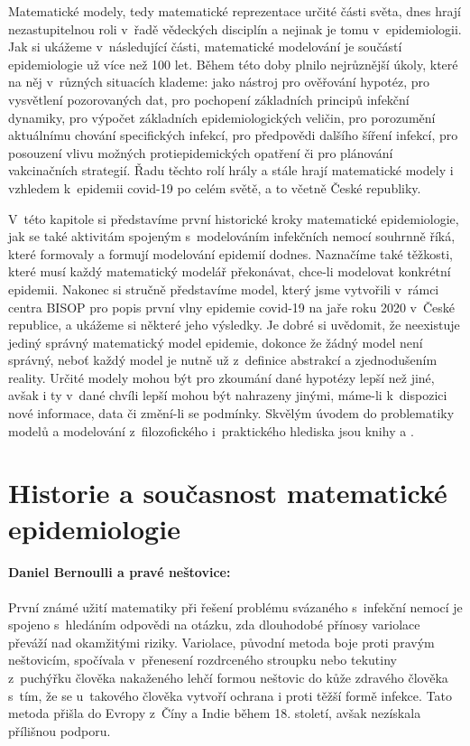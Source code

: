 Matematické modely, tedy matematické reprezentace určité části světa, dnes hrají nezastupitelnou roli v~řadě vědeckých disciplín a nejinak je tomu v~epidemiologii. Jak si ukážeme v~následující části, matematické modelování je součástí epidemiologie už více než 100 let. Během této doby plnilo nejrůznější úkoly, které na něj v~různých situacích klademe: jako nástroj pro ověřování hypotéz, pro vysvětlení pozorovaných dat, pro pochopení základních principů infekční dynamiky, pro výpočet základních epidemiologických veličin, pro porozumění aktuálnímu chování specifických infekcí, pro předpovědi dalšího šíření infekcí, pro posouzení vlivu možných protiepidemických opatření či pro plánování vakcinačních strategií. Řadu těchto rolí hrály a stále hrají matematické modely i vzhledem k~epidemii covid-19 po celém světě, a to včetně České republiky.

V~této kapitole si představíme první historické kroky matematické epidemiologie, jak se také aktivitám spojeným s~modelováním infekčních nemocí souhrnně říká, které formovaly a formují modelování epidemií dodnes. Naznačíme také těžkosti, které musí každý matematický modelář překonávat, chce-li modelovat konkrétní epidemii. Nakonec si stručně představíme model, který jsme vytvořili v~rámci centra BISOP pro popis první vlny epidemie covid-19 na jaře roku 2020 v~České republice, a ukážeme si některé jeho výsledky. Je dobré si uvědomit, že neexistuje jediný správný matematický model epidemie, dokonce že žádný model není správný, neboť každý model je nutně už z~definice abstrakcí a zjednodušením reality. Určité modely mohou být pro zkoumání dané hypotézy lepší než jiné, avšak i ty v~dané chvíli lepší mohou být nahrazeny jinými, máme-li k~dispozici nové informace, data či změní-li se podmínky. Skvělým úvodem do problematiky modelů a modelování z~filozofického i~praktického hlediska jsou knihy \cite{GerleeLundh2016} a \cite{HilbornMangel1997}.

\section*{Historie a současnost matematické epidemiologie}


\paragraph{Daniel Bernoulli a pravé neštovice:} První známé užití matematiky při řešení problému svázaného s~infekční nemocí je spojeno s~hledáním odpovědi na otázku, zda dlouhodobé přínosy variolace převáží nad okamžitými riziky. Variolace, původní metoda boje proti pravým neštovicím, spočívala v~přenesení rozdrceného stroupku nebo tekutiny z~puchýřku člověka nakaženého lehčí formou neštovic do kůže zdravého člověka s~tím, že se u~takového člověka vytvoří ochrana i proti těžší formě infekce. Tato metoda přišla do Evropy z~Číny a Indie během 18. století, avšak nezískala přílišnou podporu. 

